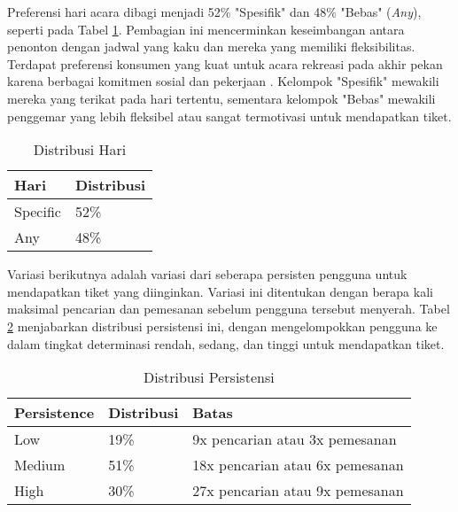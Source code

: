 Preferensi hari acara dibagi menjadi 52\% "Spesifik" dan 48\% "Bebas" (\textit{Any}), seperti pada Tabel \ref{table:distribusi-hari}. Pembagian ini mencerminkan keseimbangan antara penonton dengan jadwal yang kaku dan mereka yang memiliki fleksibilitas. Terdapat preferensi konsumen yang kuat untuk acara rekreasi pada akhir pekan karena berbagai komitmen sosial dan pekerjaan \parencite{rgate2013}. Kelompok "Spesifik" mewakili mereka yang terikat pada hari tertentu, sementara kelompok "Bebas" mewakili penggemar yang lebih fleksibel atau sangat termotivasi untuk mendapatkan tiket.

\begin{table}[H]
    \centering
    \caption{Distribusi Hari}
    \label{table:distribusi-hari}
    \begin{tabular}{|l|l|}
        \hline
        \textbf{Hari} & \textbf{Distribusi} \\
        \hline
        Specific      & 52\%                \\
        \hline
        Any           & 48\%                \\
        \hline
    \end{tabular}
\end{table}

Variasi berikutnya adalah variasi dari seberapa persisten pengguna untuk mendapatkan tiket yang diinginkan. Variasi ini ditentukan dengan berapa kali maksimal pencarian dan pemesanan sebelum pengguna tersebut menyerah. Tabel \ref{table:distribusi-persistensi} menjabarkan distribusi persistensi ini, dengan mengelompokkan pengguna ke dalam tingkat determinasi rendah, sedang, dan tinggi untuk mendapatkan tiket.

\begin{table}[H]
    \centering
    \caption{Distribusi Persistensi}
    \label{table:distribusi-persistensi}
    \begin{tabular}{|l|l|l|}
        \hline
        \textbf{Persistence} & \textbf{Distribusi} & \textbf{Batas}                      \\
        \hline
        Low                  & 19\%                & 9x pencarian atau 3x pemesanan      \\
        \hline
        Medium               & 51\%                & 18x pencarian atau 6x     pemesanan \\
        \hline
        High                 & 30\%                & 27x pencarian atau 9x pemesanan     \\
        \hline
    \end{tabular}
\end{table}


